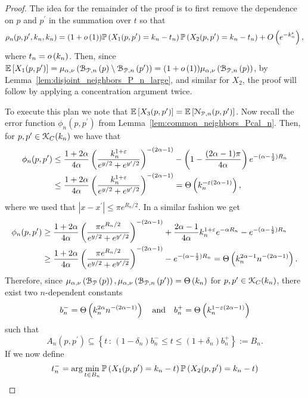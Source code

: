 \begin{proof}
The idea for the remainder of the proof is to first remove the dependence on $p$ and $p^\prime$ in the summation over $t$ so that
\[
	\rho_{n}(p,p^\prime,k_n,k_n) = (1 + o\left(1\right))\mathbb{P}\left(X_1(p,p^\prime) = k_n - t_n\right)
			\mathbb{P}\left(X_2(p,p^\prime) = k_n - t_n\right)
	+ O\left(e^{-k_n^\varepsilon}\right),
\]
where $t_n = o\left(k_n\right)$. Then, since $\mathbb{E}\left[X_1(p,p^\prime)\right] = \mu_{\alpha,\nu}\left({\mathcal B}_{{\mathcal P},n}\left(p\right)\setminus {\mathcal B}_{{\mathcal P},n}\left(p^\prime\right)\right) = 
(1 + o\left(1\right))\mu_{\alpha,\nu}\left({\mathcal B}_{{\mathcal P},n}\left(p\right)\right)$, by Lemma~\ref{lem:disjoint_neighbors_P_n_large}, and similar for $X_2$, the proof will follow by applying a concentration argument twice.

To execute this plan we note that $\mathbb{E}\left[X_3(p,p^\prime)\right] = \mathbb{E}\left[{\mathcal N}_{{\mathcal P},n}(p,p^\prime)\right]$. Now recall the error function $\phi_n(p,p^\prime)$ from Lemma~\ref{lem:common_neighbors_Pcal_n}. Then, for $p,p^\prime \in {\mathcal K}_{C}(k_n)$ we have that
\begin{align*}
	\phi_n(p,p^\prime) 
	&\le \frac{1 + 2\alpha}{4\alpha}\left(\frac{k_n^{1 + \varepsilon}}{e^{y/2} + e^{y^\prime/2}}\right)^{-(2\alpha - 1)} 
	- \left(1-\frac{(2\alpha - 1)\pi}{4\alpha}\right)e^{-(\alpha - \frac{1}{2})R_n}\\
	&\le \frac{1 + 2\alpha}{4\alpha}\left(\frac{k_n^{1 + \varepsilon}}{e^{y/2} + e^{y^\prime/2}}\right)^{-(2\alpha - 1)}
		=\Theta\left(k_n^{-\varepsilon(2\alpha - 1)}\right),
\end{align*}
where we used that $|x - x^\prime| \le \pi e^{R_n/2}$. In a similar fashion we get
\begin{align*}
	\phi_n(p,p^\prime) 
	&\ge \frac{1 + 2\alpha}{4\alpha}\left(\frac{\pi e^{R_n/2}}{e^{y/2} + e^{y^\prime/2}}\right)^{-(2\alpha - 1)}
		+ \frac{2\alpha - 1}{4\alpha} k_n^{1 + \varepsilon}e^{-\alpha R_n} - e^{-(\alpha - \frac{1}{2})R_n}\\
	&\ge \frac{1 + 2\alpha}{4\alpha}\left(\frac{\pi e^{R_n/2}}{e^{y/2} + e^{y^\prime/2}}\right)^{-(2\alpha - 1)}
		- e^{-(\alpha - \frac{1}{2})R_n} = \Theta\left(k_n^{2\alpha - 1}n^{-(2\alpha - 1)}\right).
\end{align*}
Therefore, since $\mu_{\alpha,\nu}\left({\mathcal B}_{{\mathcal P}}\left(p\right)\right), \mu_{\alpha,\nu}\left({\mathcal B}_{{\mathcal P},n}\left(p^\prime\right)\right) = \Theta\left(k_n\right)$ for $p,p^\prime \in {\mathcal K}_{C}(k_n)$, there exist two $n$-dependent constants 
\[
	b_n^- = \Theta\left(k_n^{2\alpha} n^{-(2\alpha - 1)}\right) \quad \text{and} \quad
	b_n^+ = \Theta\left(k_n^{1 - \varepsilon(2\alpha - 1)}\right)
\]
such that
\[
	A_n(p,p^\prime) \subseteq \left\{t \, : \, (1-\delta_n)b_n^- \le t \le (1+\delta_n)b_n^+ \right\} := B_n.
\]
If we now define
\begin{align*}
	t_n^- &= \arg \min_{t \in B_n} \Prob{X_1(p,p^\prime) = k_n - t}\Prob{X_2(p,p^\prime) = k_n - t}\\

\end{align*}
\end{proof}
